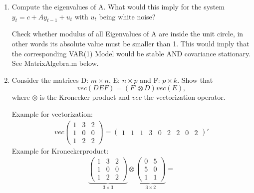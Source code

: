 \documentclass[a4paper]{scrartcl}
\begin{document}
    \begin{enumerate}
        \item Compute the eigenvalues of A. What would this imply for the system $y_t = c + A y_{t-1} + u_t$ with $u_t$ being white noise?
              \begin{solution}
                  Check whether modulus of all Eigenvalues of A are inside the unit circle, in other words its absolute value must be smaller than 1.
                  This would imply that the corresponding VAR(1) Model would be stable AND covariance stationary. See MatrixAlgebra.m  below.
              \end{solution}
              
        \item Consider the matrices D: $m\times n$, E: $n\times p$ and F: $p\times k$. Show that $$vec(DEF)=\left(F'\otimes D\right) vec(E),$$ where $\otimes$ is the Kronecker product and $vec$ the vectorization operator.
              \begin{solution}
                  Example for vectorization:
                  \begin{align*}
                      vec\begin{pmatrix} 1&3&2\\1&0&0\\1&2&2 \end{pmatrix} = \begin{pmatrix} 1 &1 &1 &3 &0&2&2&0&2\end{pmatrix}'
                  \end{align*}
                  Example for Kroneckerproduct:
                  \begin{align*}
                      \underbrace{\begin{pmatrix} 1&3&2\\1&0&0\\1&2&2 \end{pmatrix}}_{3\times3} \otimes \underbrace{\begin{pmatrix}0&5\\5&0\\1&1 \end{pmatrix}}_{3\times2} =

\end{align*}
\end{solution}
\end{enumerate}
\end{document}
